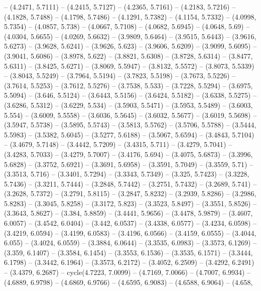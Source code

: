 {  -- (4.2471, 5.7111) -- (4.2415, 5.7127) -- (4.2365, 5.7161) -- (4.2183, 
  5.7216) -- (4.1828, 5.7488) -- (4.1798, 5.7486) -- (4.1291, 5.7382) -- 
  (4.1154, 5.7332) -- (4.0998, 5.7354) -- (4.0857, 5.738) -- (4.0667, 5.7108) --
   (4.0682, 5.6945) -- (4.0648, 5.69) -- (4.0304, 5.6655) -- (4.0269, 5.6632) --
   (3.9809, 5.6464) -- (3.9515, 5.6443) -- (3.9616, 5.6273) -- (3.9628, 5.6241) 
  -- (3.9626, 5.623) -- (3.9606, 5.6209) -- (3.9099, 5.6095) -- (3.9041, 5.6086)
   -- (3.8978, 5.622) -- (3.8821, 5.6308) -- (3.8728, 5.6314) -- (3.8477, 
  5.6311) -- (3.8425, 5.6271) -- (3.8069, 5.5947) -- (3.8132, 5.5572) -- 
  (3.8073, 5.5339) -- (3.8043, 5.5249) -- (3.7964, 5.5194) -- (3.7823, 5.5198) 
  -- (3.7673, 5.5226) -- (3.7614, 5.5253) -- (3.7612, 5.5276) -- (3.7538, 5.533)
   -- (3.7228, 5.5294) -- (3.6975, 5.5094) -- (3.646, 5.5124) -- (3.6443, 
  5.5156) -- (3.6424, 5.5182) -- (3.6338, 5.5275) -- (3.6286, 5.5312) -- 
  (3.6229, 5.534) -- (3.5903, 5.5471) -- (3.5953, 5.5489) -- (3.6003, 5.554) -- 
  (3.6009, 5.5558) -- (3.6036, 5.5645) -- (3.6032, 5.5677) -- (3.6019, 5.5698) 
  -- (3.5947, 5.5738) -- (3.5895, 5.5743) -- (3.5813, 5.5762) -- (3.5706, 
  5.5788) -- (3.5444, 5.5983) -- (3.5382, 5.6045) -- (3.5277, 5.6188) -- 
  (3.5067, 5.6594) -- (3.4843, 5.7104) -- (3.4679, 5.7148) -- (3.4442, 5.7209) 
  -- (3.4315, 5.711) -- (3.4279, 5.7041) -- (3.4283, 5.7033) -- (3.4279, 5.7007)
   -- (3.4176, 5.694) -- (3.4075, 5.6873) -- (3.3996, 5.6828) -- (3.3752, 
  5.6921) -- (3.3691, 5.6958) -- (3.3591, 5.7049) -- (3.3559, 5.71) -- (3.3513, 
  5.716) -- (3.3401, 5.7294) -- (3.3343, 5.7349) -- (3.325, 5.7423) -- (3.3228, 
  5.7436) -- (3.3211, 5.7444) -- (3.2848, 5.7442) -- (3.2751, 5.7432) -- 
  (3.2689, 5.741) -- (3.2628, 5.7372) -- (3.2791, 5.8115) -- (3.2847, 5.8232) --
   (3.2939, 5.8286) -- (3.2986, 5.8283) -- (3.3045, 5.8258) -- (3.3172, 5.823) 
  -- (3.3523, 5.8497) -- (3.3551, 5.8526) -- (3.3643, 5.8627) -- (3.384, 5.8859)
   -- (3.4441, 5.9656) -- (3.4478, 5.9879) -- (3.4607, 6.0057) -- (3.4542, 
  6.0404) -- (3.442, 6.0537) -- (3.4338, 6.0577) -- (3.4234, 6.0598) -- (3.4219,
   6.0594) -- (3.4199, 6.0583) -- (3.4196, 6.0566) -- (3.4159, 6.0555) -- 
  (3.4044, 6.055) -- (3.4024, 6.0559) -- (3.3884, 6.0644) -- (3.3535, 6.0983) --
   (3.3573, 6.1269) -- (3.359, 6.1407) -- (3.3584, 6.1454) -- (3.3553, 6.1536) 
  -- (3.3535, 6.1571) -- (3.3444, 6.1798) -- (3.3442, 6.1964) -- (3.3573, 
  6.2172) -- (3.4052, 6.2509) -- (3.4292, 6.2491) -- (3.4379, 6.2687) -- 
  cycle(4.7223, 7.0099) -- (4.7169, 7.0066) -- (4.7007, 6.9934) -- (4.6889, 
  6.9798) -- (4.6869, 6.9766) -- (4.6595, 6.9083) -- (4.6588, 6.9064) -- (4.658,
}
